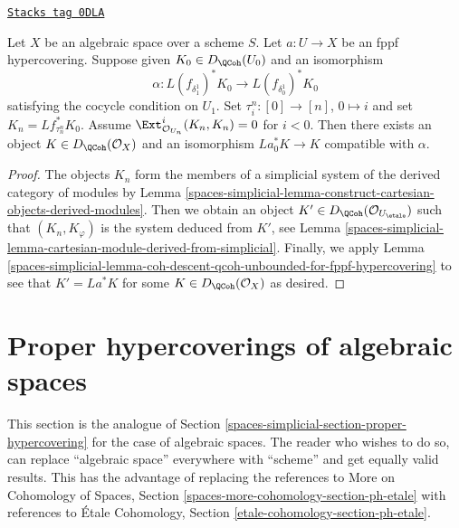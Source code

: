 \begin{lemma}
\label{spaces-simplicial-lemma-fppf-glue-neg-ext-zero}
\href{https://stacks.math.columbia.edu/tag/0DLA}{\texttt{Stacks tag 0DLA}}

Let $X$ be an algebraic space over a scheme $S$.
Let $a : U \to X$ be an fppf hypercovering.
Suppose given $K_0 \in D_\QCoh(U_0)$ and an isomorphism
$$
\alpha :
L(f_{\delta_1^1})^*K_0
\longrightarrow
L(f_{\delta_0^1})^*K_0
$$
satisfying the cocycle condition on $U_1$. Set
$\tau^n_i : [0] \to [n]$, $0 \mapsto i$ and
set $K_n = Lf_{\tau^n_n}^*K_0$.
Assume $\Ext^i_{\mathcal{O}_{U_n}}(K_n, K_n) = 0$ for $i < 0$.
Then there exists an object $K \in D_\QCoh(\mathcal{O}_X)$
and an isomorphism $La_0^*K \to K$ compatible with $\alpha$.
\end{lemma}

\begin{proof}
The objects $K_n$ form the members of a  simplicial system of the
derived category of modules by
Lemma \ref{spaces-simplicial-lemma-construct-cartesian-objects-derived-modules}.
Then we obtain an object
$K' \in D_\QCoh(\mathcal{O}_{U_\etale})$
such that $(K_n, K_\varphi)$ is the system deduced from $K'$, see
Lemma \ref{spaces-simplicial-lemma-cartesian-module-derived-from-simplicial}.
Finally, we apply
Lemma \ref{spaces-simplicial-lemma-coh-descent-qcoh-unbounded-for-fppf-hypercovering}
to see that $K' = La^*K$ for some $K \in D_\QCoh(\mathcal{O}_X)$
as desired.
\end{proof}

\section{Proper hypercoverings of algebraic spaces}
\label{spaces-simplicial-section-proper-hypercovering-spaces}
This section is the analogue of Section \ref{spaces-simplicial-section-proper-hypercovering}
for the case of algebraic spaces.
The reader who wishes to do so, can replace ``algebraic space''
everywhere with ``scheme'' and get equally valid results.
This has the advantage of replacing the references to
More on Cohomology of Spaces, Section
\ref{spaces-more-cohomology-section-ph-etale}
with references to
\'Etale Cohomology, Section \ref{etale-cohomology-section-ph-etale}.


